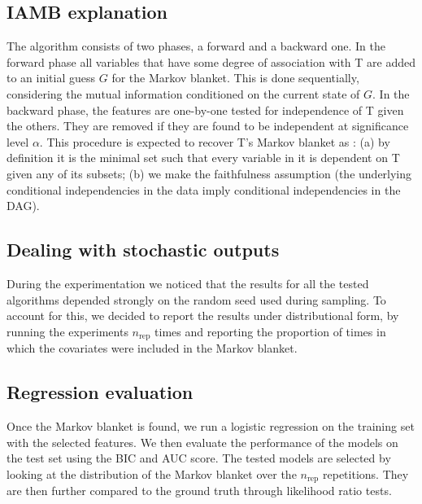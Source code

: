 \documentclass[a4paper, 12pt,oneside]{article}
\begin{document}
        \subsection{IAMB explanation}
        The algorithm  consists of two phases, a forward and a backward one. 
        In the forward phase all variables that have some degree of association with T are added to an initial guess $G$ for the Markov blanket. This is done sequentially, considering the mutual information conditioned on the current state of $G$. In the backward phase, the features are one-by-one tested for independence of T given the others. They are removed if they are found to be independent at significance level $\alpha$.
        This procedure is expected to recover T's Markov blanket as : (a) by definition it is the minimal set such that every variable in it is dependent on T given any of its subsets; (b) we make the faithfulness assumption (the underlying conditional independencies in the data imply conditional independencies in the DAG).
        \subsection{Dealing with stochastic outputs}
        During the experimentation we noticed that the results for all the tested algorithms depended strongly on the random seed used during sampling. To account for this, we decided to report the results under distributional form, by running the experiments $n_{\text{rep}}$ times and reporting the proportion of times in which the covariates were included in the Markov blanket. 
        \subsection{Regression evaluation}
        Once the Markov blanket is found, we run a logistic regression on the training set with the selected features. We then evaluate the performance of the models on the test set using the BIC and AUC score. The tested models are selected by looking at the distribution of the Markov blanket over the $n_{\text{rep}}$ repetitions. They are then further compared to the ground truth through likelihood ratio tests.
\end{document}
